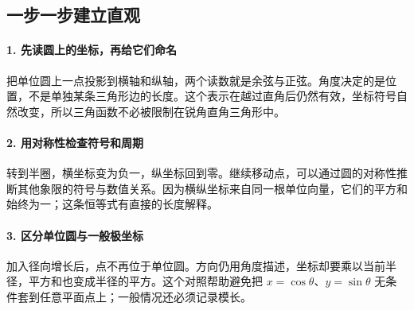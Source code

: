 \subsection*{一步一步建立直观}

\paragraph{1. 先读圆上的坐标，再给它们命名}

把单位圆上一点投影到横轴和纵轴，两个读数就是余弦与正弦。角度决定的是位置，不是单独某条三角形边的长度。这个表示在越过直角后仍然有效，坐标符号自然改变，所以三角函数不必被限制在锐角直角三角形中。



\paragraph{2. 用对称性检查符号和周期}

转到半圈，横坐标变为负一，纵坐标回到零。继续移动点，可以通过圆的对称性推断其他象限的符号与数值关系。因为横纵坐标来自同一根单位向量，它们的平方和始终为一；这条恒等式有直接的长度解释。



\paragraph{3. 区分单位圆与一般极坐标}

加入径向增长后，点不再位于单位圆。方向仍用角度描述，坐标却要乘以当前半径，平方和也变成半径的平方。这个对照帮助避免把 $x=\cos\theta$、$y=\sin\theta$ 无条件套到任意平面点上；一般情况还必须记录模长。
